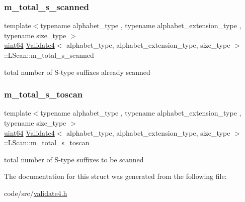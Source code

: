 \mbox{\label{struct_validate4_1_1_l_scan_a7b3fae11ba397c30d0f25f055e02cdf1}} 
\subsubsection{\texorpdfstring{m\+\_\+total\+\_\+s\+\_\+scanned}{m\_total\_s\_scanned}}
{\footnotesize\ttfamily template$<$typename alphabet\+\_\+type , typename alphabet\+\_\+extension\+\_\+type , typename size\+\_\+type $>$ \\
\hyperlink{types_8h_a60e8696a4678cd348e991a1f172e53f7}{uint64} \hyperlink{class_validate4}{Validate4}$<$ alphabet\+\_\+type, alphabet\+\_\+extension\+\_\+type, size\+\_\+type $>$\+::L\+Scan\+::m\+\_\+total\+\_\+s\+\_\+scanned\hspace{0.3cm}{\ttfamily [private]}}



total number of S-\/type suffixes already scanned 

\mbox{\label{struct_validate4_1_1_l_scan_abaf348442b39a1a0447a382e1f66f13b}} 
\subsubsection{\texorpdfstring{m\+\_\+total\+\_\+s\+\_\+toscan}{m\_total\_s\_toscan}}
{\footnotesize\ttfamily template$<$typename alphabet\+\_\+type , typename alphabet\+\_\+extension\+\_\+type , typename size\+\_\+type $>$ \\
\hyperlink{types_8h_a60e8696a4678cd348e991a1f172e53f7}{uint64} \hyperlink{class_validate4}{Validate4}$<$ alphabet\+\_\+type, alphabet\+\_\+extension\+\_\+type, size\+\_\+type $>$\+::L\+Scan\+::m\+\_\+total\+\_\+s\+\_\+toscan\hspace{0.3cm}{\ttfamily [private]}}



total number of S-\/type suffixes to be scanned 



The documentation for this struct was generated from the following file\+:\begin{DoxyCompactItemize}
\item 
code/src/\hyperlink{validate4_8h}{validate4.\+h}\end{DoxyCompactItemize}
